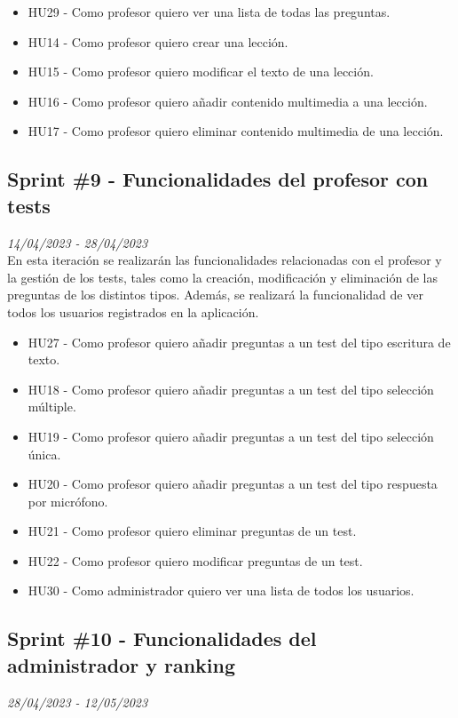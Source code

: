 \begin{itemize}
    \item HU29 - Como profesor quiero ver una lista de todas las preguntas.
    \item HU14 - Como profesor quiero crear una lección.
    \item HU15 - Como profesor quiero modificar el texto de una lección.
    \item HU16 - Como profesor quiero añadir contenido multimedia a una lección.
    \item HU17 - Como profesor quiero eliminar contenido multimedia de una lección.
\end{itemize}

\subsection{Sprint \#9 - Funcionalidades del profesor con tests}
\textit{14/04/2023   -   28/04/2023}\\

En esta iteración se realizarán las funcionalidades relacionadas con el profesor y la gestión de los tests, tales como la creación, modificación y eliminación de las preguntas
de los distintos tipos. Además, se realizará la funcionalidad de ver todos los usuarios registrados en la aplicación.


\begin{itemize}
    \item HU27 - Como profesor quiero añadir preguntas a un test del tipo escritura de texto.
    \item HU18 - Como profesor quiero añadir preguntas a un test del tipo selección múltiple.
    \item HU19 - Como profesor quiero añadir preguntas a un test del tipo selección única.
    \item HU20 - Como profesor quiero añadir preguntas a un test del tipo respuesta por micrófono.
    \item HU21 - Como profesor quiero eliminar preguntas de un test.
    \item HU22 - Como profesor quiero modificar preguntas de un test.
    \item HU30 - Como administrador quiero ver una lista de todos los usuarios.
\end{itemize}


\subsection{Sprint \#10 - Funcionalidades del administrador y ranking}
\textit{28/04/2023   -   12/05/2023}\\

